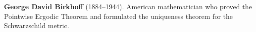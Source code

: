\textbf{George David Birkhoff} (1884–1944). American mathematician who proved the Pointwise Ergodic Theorem and formulated the uniqueness theorem for the Schwarzschild metric.

